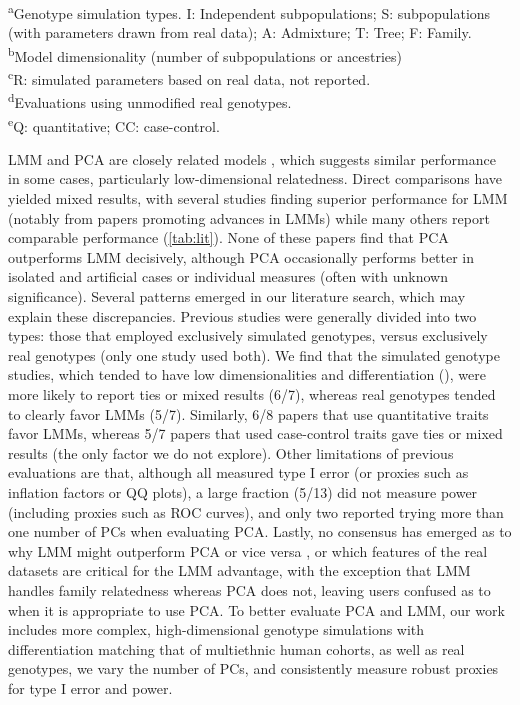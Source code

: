 \documentclass[11pt]{article}
\begin{document}
\begin{table}[hb!]
\begin{tabular}{l|ccc|ccccc}
    \bottomrule
  \end{tabular}
  \begin{flushleft} 
    \textsuperscript{a}Genotype simulation types. I: Independent subpopulations; S: subpopulations (with parameters drawn from real data); A: Admixture; T: Tree; F: Family.\\
    \textsuperscript{b}Model dimensionality (number of subpopulations or ancestries)\\
    \textsuperscript{c}R: simulated parameters based on real data, \Fst not reported.\\
    \textsuperscript{d}Evaluations using unmodified real genotypes.\\
    \textsuperscript{e}Q: quantitative; CC: case-control.
  \end{flushleft}
\end{table}


LMM and PCA are closely related models \citep{astle_population_2009, hoffman_correcting_2013}, which suggests similar performance in some cases, particularly low-dimensional relatedness.
Direct comparisons have yielded mixed results, with several studies finding superior performance for LMM (notably from papers promoting advances in LMMs) while many others report comparable performance (\cref{tab:lit}).
None of these papers find that PCA outperforms LMM decisively, although PCA occasionally performs better in isolated and artificial cases or individual measures (often with unknown significance).
Several patterns emerged in our literature search, which may explain these discrepancies.
Previous studies were generally divided into two types: those that employed exclusively simulated genotypes, versus exclusively real genotypes (only one study used both).
We find that the simulated genotype studies, which tended to have low dimensionalities and differentiation (\Fst), were more likely to report ties or mixed results (6/7), whereas real genotypes tended to clearly favor LMMs (5/7).
Similarly, 6/8 papers that use quantitative traits favor LMMs, whereas 5/7 papers that used case-control traits gave ties or mixed results (the only factor we do not explore).
Other limitations of previous evaluations are that, although all measured type I error (or proxies such as inflation factors or QQ plots), a large fraction (5/13) did not measure power (including proxies such as ROC curves), and only two reported trying more than one number of PCs when evaluating PCA.
Lastly, no consensus has emerged as to why LMM might outperform PCA or vice versa \citep{price_new_2010, sul_mixed_2013, price_response_2013, hoffman_correcting_2013}, or which features of the real datasets are critical for the LMM advantage, with the exception that LMM handles family relatedness whereas PCA does not, leaving users confused as to when it is appropriate to use PCA.
To better evaluate PCA and LMM, our work includes more complex, high-dimensional genotype simulations with differentiation matching that of multiethnic human cohorts, as well as real genotypes, we vary the number of PCs, and consistently measure robust proxies for type I error and power.
\end{document}
